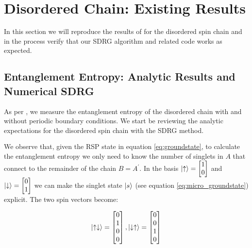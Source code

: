 \section{Disordered Chain: Existing Results}\label{sec:disordered_old_results}
In this section we will reproduce the results of \cite{paola2016} for the disordered spin chain and in the process verify that our SDRG algorithm and related code works as expected.

\subsection{Entanglement Entropy: Analytic Results and Numerical SDRG}\label{subsec:baseline_entropy}
As per \cite{paola2016}, we measure the entanglement entropy of the disordered chain with and without periodic boundary conditions. We start be reviewing the analytic expectations for the disordered spin chain with the SDRG method. 

We observe that, given the RSP state in equation \ref{eq:groundstate}, to calculate the entanglement entropy we only need to know the number of singlets in $A$ that connect to the remainder of the chain $B = A^\prime$. In the basis $\ket{\uparrow} = \begin{bmatrix}
	1 \\
	0 
\end{bmatrix}$ and $\ket	{\downarrow} = \begin{bmatrix}
	0 \\
	1 
\end{bmatrix}$ we can make the singlet state $\ket{s}$ (see equation \ref{eq:micro_groundstate}) explicit. The two spin vectors become: 

\begin{equation}
	\ket{\uparrow \downarrow} = \begin{bmatrix}
	0 \\
	1 \\
	0 \\
	0 \\
\end{bmatrix}, \ket{\downarrow \uparrow} = \begin{bmatrix}
	0 \\
	0 \\
	1 \\
	0 \\
\end{bmatrix}
\end{equation}

